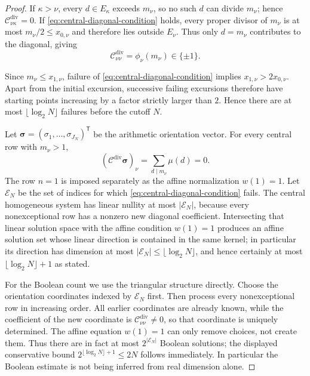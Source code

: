 \documentclass[11pt]{amsart}
\numberwithin{equation}{section}
\theoremstyle{plain}
\theoremstyle{definition}
\theoremstyle{remark}
\begin{document}
\begin{proof}
If $\kappa>\nu$, every $d\in E_\kappa$ exceeds $m_\nu$, so no such $d$ can
divide $m_\nu$; hence $\mathscr C^{\mathrm{div}}_{\nu\kappa}=0$.  If
\eqref{eq:central-diagonal-condition} holds, every proper divisor of
$m_\nu$ is at most $m_\nu/2\le x_{0,\nu}$ and therefore lies outside
$E_\nu$.  Thus only $d=m_\nu$ contributes to the diagonal, giving
\[
\mathscr C^{\mathrm{div}}_{\nu\nu}=\phi_\nu(m_\nu)\in\{\pm1\}.
\]

Since $m_\nu\le x_{1,\nu}$, failure of
\eqref{eq:central-diagonal-condition} implies
$x_{1,\nu}>2x_{0,\nu}$.  Apart from the initial excursion, successive
failing excursions therefore have starting points increasing by a factor
strictly larger than $2$.  Hence there are at most
$\lfloor\log_2N\rfloor$ failures before the cutoff $N$.

Let $\boldsymbol\sigma=(\sigma_1,\dots,\sigma_{J_N})^{\mathsf T}$ be the
arithmetic orientation vector.  For every central row with $m_\nu>1$,
\[
(\mathscr C^{\mathrm{div}}\boldsymbol\sigma)_\nu
=
\sum_{d\mid m_\nu}\mu(d)=0.
\]
The row $n=1$ is imposed separately as the affine normalization $w(1)=1$.
Let $\mathcal E_N$ be the set of indices for which
\eqref{eq:central-diagonal-condition} fails.  The central homogeneous system
has linear nullity at most $|\mathcal E_N|$, because every nonexceptional row
has a nonzero new diagonal coefficient.  Intersecting that linear solution
space with the affine condition $w(1)=1$ produces an affine solution set whose
linear direction is contained in the same kernel; in particular its direction
has dimension at most $|\mathcal E_N|\le\lfloor\log_2N\rfloor$, and hence
certainly at most $\lfloor\log_2N\rfloor+1$ as stated.

For the Boolean count we use the triangular structure directly.  Choose the
orientation coordinates indexed by $\mathcal E_N$ first.  Then process every
nonexceptional row in increasing order.  All earlier coordinates are already
known, while the coefficient of the new coordinate is
$\mathscr C^{\mathrm{div}}_{\nu\nu}\ne0$, so that coordinate is uniquely
determined.  The affine equation $w(1)=1$ can only remove choices, not create
them.  Thus there are in fact at most $2^{|\mathcal E_N|}$ Boolean solutions;
the displayed conservative bound
$2^{\lfloor\log_2N\rfloor+1}\le2N$ follows immediately.  In particular the
Boolean estimate is not being inferred from real dimension alone.


\end{proof}
\end{document}

